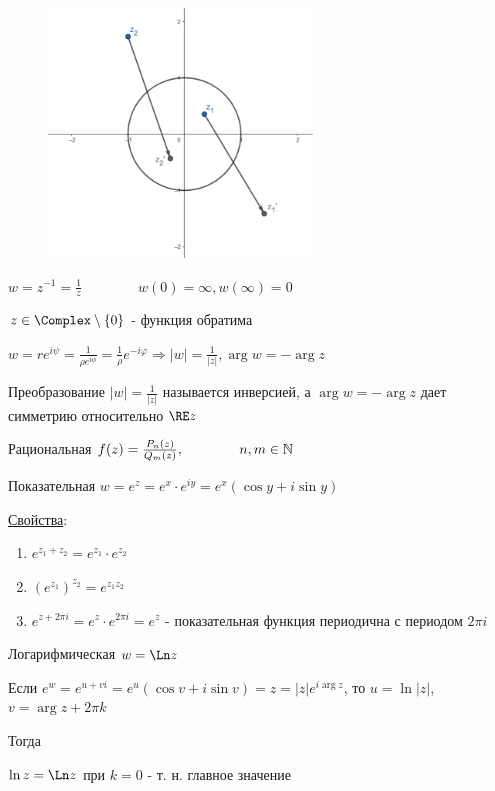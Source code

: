 \documentclass[12pt]{article}
\begin{document}
\begin{figure}
    \includegraphics[width=7cm]{addchapters2/images/addchapters2_2025_02_21_1}
\end{figure}

\Exs $w = z^{-1} = \frac{1}{z} \qquad\qquad w(0) = \infty, w(\infty) = 0$

$z \in \Complex \setminus \{0\}$ - функция обратима

$w = re^{i\psi} = \frac{1}{\rho e^{i\phi}} = \frac{1}{\rho} e^{-i\varphi} \Longrightarrow |w| = \frac{1}{|z|}, \arg w = -\arg z$

Преобразование $|w| = \frac{1}{|z|}$ называется инверсией, а $\arg w = -\arg z$ дает симметрию относительно $\RE z$

 Рациональная $f(z) = \frac{P_n(z)}{Q_m(z)}, \qquad\qquad n, m \in \mathbb{N}$

 Показательная $w = e^z = e^x \cdot e^{iy} = e^x (\cos y + i \sin y)$

\underline{Свойства}: 

\begin{enumerate}
    \item $e^{z_1 + z_2} = e^{z_1} \cdot e^{z_2}$
    \item $\left(e^{z_1}\right)^{z_2} = e^{z_1 z_2}$
    \item $e^{z + 2\pi i} = e^{z} \cdot e^{2\pi i} = e^z$ - показательная функция периодична с периодом $2\pi i$
\end{enumerate}

 Логарифмическая $w = \Ln z$

Если $e^w = e^{u + vi} = e^u (\cos v + i \sin v) = z = |z| e^{i\arg z}$, то $u = \ln |z|$, $v = \arg z + 2\pi k$

Тогда 

$\ln z = \Ln z$ при $k = 0$ - т. н. главное значение
\end{document}
